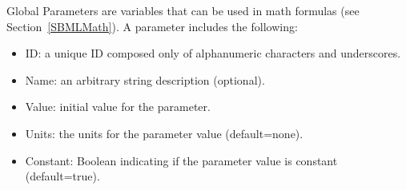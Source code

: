\documentclass[titlepage,11pt]{article}
\begin{document}

\noindent
Global Parameters are variables that can be used in math formulas (see Section~\ref{SBMLMath}).  A parameter includes the following:
\begin{itemize}
\item ID: a unique ID composed only of alphanumeric characters and underscores.
\item Name: an arbitrary string description (optional).
\item Value: initial value for the parameter.
\item Units: the units for the parameter value (default=none).
\item Constant: Boolean indicating if the parameter value is constant (default=true).
\end{itemize}
\end{document}
